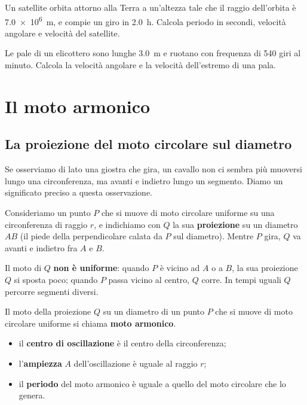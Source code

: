 \begin{esercizio}
Un satellite orbita attorno alla Terra a un'altezza tale che il raggio dell'orbita è \SI{7,0e6}{\metre}, e compie un giro in \SI{2,0}{\hour}. Calcola periodo in secondi, velocità angolare e velocità del satellite.\\
\end{esercizio}

\begin{esercizio}
Le pale di un elicottero sono lunghe \SI{3,0}{\metre} e ruotano con frequenza di \SI{540}{} giri al minuto. Calcola la velocità angolare e la velocità dell'estremo di una pala.\\
\end{esercizio}

\section{Il moto armonico}

\subsection{La proiezione del moto circolare sul diametro}
Se osserviamo di lato una giostra che gira, un cavallo non ci sembra più muoversi lungo una circonferenza, ma avanti e indietro lungo un segmento. Diamo un significato preciso a questa osservazione.

Consideriamo un punto $P$ che si muove di moto circolare uniforme su una circonferenza di raggio $r$, e indichiamo con $Q$ la sua \textbf{proiezione} su un diametro $AB$ (il piede della perpendicolare calata da $P$ sul diametro). Mentre $P$ gira, $Q$ va avanti e indietro fra $A$ e $B$.

Il moto di $Q$ \textbf{non è uniforme}: quando $P$ è vicino ad $A$ o a $B$, la sua proiezione $Q$ si sposta poco; quando $P$ passa vicino al centro, $Q$ corre. In tempi uguali $Q$ percorre segmenti diversi.

\begin{definizione}
Il moto della proiezione $Q$ su un diametro di un punto $P$ che si muove di moto circolare uniforme si chiama \textbf{moto armonico}.
\begin{itemize}
    \item il \textbf{centro di oscillazione} è il centro della circonferenza;
    \item l'\textbf{ampiezza} $A$ dell'oscillazione è uguale al raggio $r$;
    \item il \textbf{periodo} del moto armonico è uguale a quello del moto circolare che lo genera.
\end{itemize}
\end{definizione}

